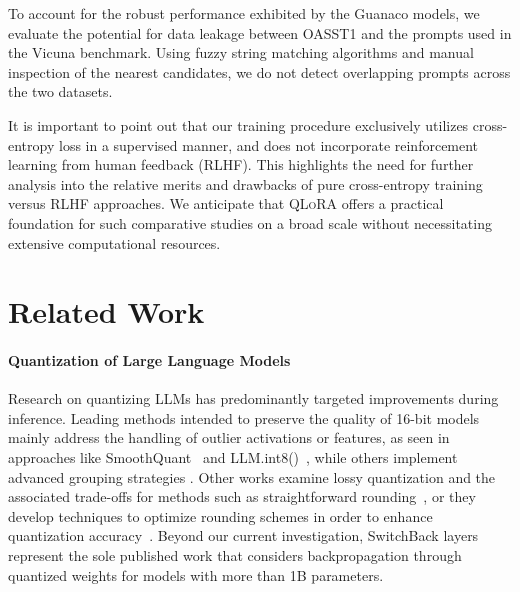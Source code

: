 To account for the robust performance exhibited by the {Guanaco} models, we evaluate the potential for data leakage between OASST1 and the prompts used in the Vicuna benchmark. Using fuzzy string matching algorithms and manual inspection of the nearest candidates, we do not detect overlapping prompts across the two datasets.

It is important to point out that our training procedure exclusively utilizes cross-entropy loss in a supervised manner, and does not incorporate reinforcement learning from human feedback (RLHF). This highlights the need for further analysis into the relative merits and drawbacks of pure cross-entropy training versus RLHF approaches. We anticipate that \textsc{QLoRA} offers a practical foundation for such comparative studies on a broad scale without necessitating extensive computational resources.

\section{Related Work}

\paragraph{Quantization of Large Language Models} Research on quantizing LLMs has predominantly targeted improvements during inference. Leading methods intended to preserve the quality of 16-bit models mainly address the handling of outlier activations or features, as seen in approaches like SmoothQuant~\citep{xiao2022smoothquant} and LLM.int8()~\citep{dettmers2022llm}, while others implement advanced grouping strategies \citep{park2022nuqmm, yao2022zeroquant}. Other works examine lossy quantization and the associated trade-offs for methods such as straightforward rounding~\citep{dettmers2022case,zeng2022glm,pope2022efficiently}, or they develop techniques to optimize rounding schemes in order to enhance quantization accuracy~\citep{frantar2022gptq}. Beyond our current investigation, SwitchBack layers~\citep{wortsman2023stable} represent the sole published work that considers backpropagation through quantized weights for models with more than 1B parameters.

